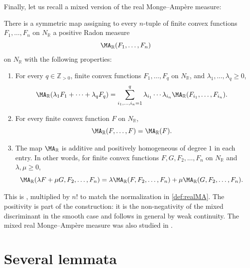 Finally, let us recall a mixed version of the real Monge--Ampère measure:
\begin{theorem}\label{thm:mixed_realMA}
    There is a symmetric map assigning to every $n$-tuple of finite convex functions $F_1,\ldots,F_n$ on $N_{\mathbb R}$ a positive Radon measure
    \[
        \MA_{\mathbb R}(F_1,\ldots,F_n)
    \]
    on $N_{\mathbb R}$ with the following properties:
    \begin{enumerate}
        \item\label{itm:thm:mixed_realMA:1} For every $q\in \mathbb Z_{>0}$, finite convex functions $F_1,\ldots,F_q$ on $N_{\mathbb R}$, and $\lambda_1,\ldots,\lambda_q\geq 0$,
        \[
            \MA_{\mathbb R}(\lambda_1F_1+\cdots+\lambda_qF_q)
            =\sum_{i_1,\ldots,i_n=1}^q
            \lambda_{i_1}\cdots\lambda_{i_n}
            \MA_{\mathbb R}(F_{i_1},\ldots,F_{i_n}).
        \]
        \item\label{itm:thm:mixed_realMA:2} For every finite convex function $F$ on $N_{\mathbb R}$,
        \[
            \MA_{\mathbb R}(F,\ldots,F)=\MA_{\mathbb R}(F).
        \]
        \item\label{itm:thm:mixed_realMA:3} The map $\MA_{\mathbb R}$ is additive and positively homogeneous of degree $1$ in each entry. In other words, for finite convex functions $F,G,F_2,\ldots,F_n$ on $N_{\mathbb R}$ and $\lambda,\mu\geq 0$,
        \[
            \MA_{\mathbb R}(\lambda F+\mu G,F_2,\ldots,F_n)
            =\lambda\MA_{\mathbb R}(F,F_2,\ldots,F_n)
            +\mu\MA_{\mathbb R}(G,F_2,\ldots,F_n).
        \]
    \end{enumerate}
\end{theorem}
This is \cite[Theorem~4.3(a),(b),(f)]{CLM22}, multiplied by $n!$ to match the normalization in \cref{def:realMA}. The positivity is part of the construction: it is the non-negativity of the mixed discriminant in the smooth case and follows in general by weak continuity. The mixed real Monge--Ampère measure was also studied in \cite{TW02,PR04}.

\section{Several lemmata}
\label{sec:convex_sep}

